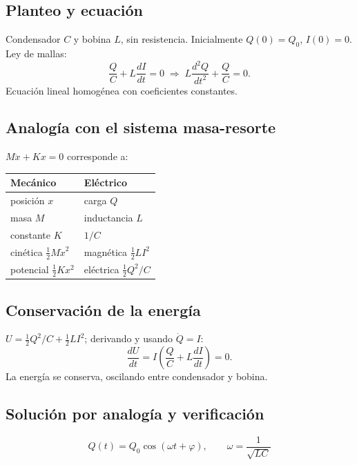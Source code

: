 \documentclass[12pt,a4paper]{article}
\begin{document}
\subsection{Planteo y ecuación}

Condensador $C$ y bobina $L$, sin resistencia. Inicialmente $Q(0)=Q_0$,
$I(0)=0$. Ley de mallas:
\[
\frac{Q}{C} + L\frac{dI}{dt} = 0 \;\Longrightarrow\;
L\frac{d^2Q}{dt^2} + \frac{Q}{C} = 0.
\]
Ecuación lineal homogénea con coeficientes constantes.

\subsection{Analogía con el sistema masa-resorte}

$M\ddot x + Kx = 0$ corresponde a:

\begin{center}
\begin{tabular}{@{}ll@{}}
\toprule
Mecánico & Eléctrico \\
\midrule
posición $x$ & carga $Q$ \\
masa $M$ & inductancia $L$ \\
constante $K$ & $1/C$ \\
cinética $\tfrac12 M\dot x^2$ & magnética $\tfrac12 L I^2$ \\
potencial $\tfrac12 K x^2$ & eléctrica $\tfrac12 Q^2/C$ \\
\bottomrule
\end{tabular}
\end{center}



\subsection{Conservación de la energía}

$U = \tfrac12 Q^2/C + \tfrac12 L I^2$; derivando y usando $\dot Q = I$:
\[
\frac{dU}{dt} = I\left(\frac{Q}{C} + L\frac{dI}{dt}\right) = 0.
\]
La energía se conserva, oscilando entre condensador y bobina.



\subsection{Solución por analogía y verificación}

\begin{keybox}
  \[
  Q(t) = Q_0\cos(\omega t + \varphi), \qquad \boxed{\omega = \frac{1}{\sqrt{LC}}}
  \]
\end{keybox}
\end{document}
